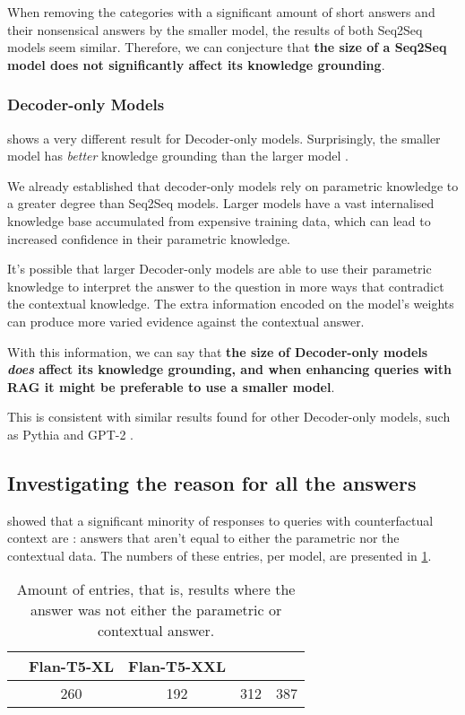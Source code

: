 When removing the categories with a significant amount of short answers and their nonsensical answers by the smaller model, the results of both Seq2Seq models seem similar.
Therefore, we can conjecture that \textbf{the size of a Seq2Seq model does not significantly affect its knowledge grounding}.

\subsubsection{Decoder-only Models}

 shows a very different result for Decoder-only models.
Surprisingly, the smaller model \smallllama{} has \textit{better} knowledge grounding than the larger model \bigllama{}.

We already established that decoder-only models rely on parametric knowledge to a greater degree than Seq2Seq models.
Larger models have a vast internalised knowledge base accumulated from expensive training data, which can lead to increased confidence in their parametric knowledge.

It's possible that larger Decoder-only models are able to use their parametric knowledge to interpret the answer to the question in more ways that contradict the contextual knowledge.
The extra information encoded on the model's weights can produce more varied evidence against the contextual answer.

With this information, we can say that \textbf{the size of Decoder-only models \textit{does} affect its knowledge grounding, and when enhancing queries with RAG it might be preferable to use a smaller model}.

This is consistent with similar results found for other Decoder-only models, such as Pythia and GPT-2 \citep{factual_recall}.

\subsection{Investigating the reason for all the \Other{} answers}
\label{what_are_all_these_others}

 showed that a significant minority of responses to queries with counterfactual context are \Other{}: answers that aren't equal to either the parametric nor the contextual data.
The numbers of these entries, per model, are presented in \cref{others_list}.

\begin{table}[h]
	\centering
	\scriptsize
	\begin{tabular}{>{\bfseries}l | c c c c}
		\toprule
			& \ttfamily\scriptsize Flan-T5-XL & \ttfamily\scriptsize Flan-T5-XXL & \ttfamily\scriptsize \llamaparbox{} & \ttfamily\scriptsize \bigllamaparbox{} \\
		\midrule
			\Other{} & 260 & 192 & 312 & 387 \\
		\bottomrule
	\end{tabular}
	\caption{Amount of \Other{} entries, that is, results where the answer was not either the parametric or contextual answer.}
	\label{others_list}
\end{table}

